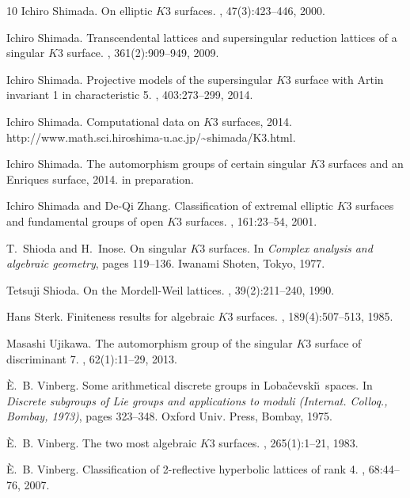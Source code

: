 \documentclass{amsart}
\theoremstyle{plain}
\theoremstyle{definition}
\theoremstyle{remark}
\numberwithin{equation}{section}
\numberwithin{table}{section}
\numberwithin{figure}{section}
\begin{document}
\begin{thebibliography}{10}
Ichiro Shimada.
\newblock On elliptic {$K3$} surfaces.
, 47(3):423--446, 2000.


Ichiro Shimada.
\newblock Transcendental lattices and supersingular reduction lattices of a
  singular {$K3$} surface.
, 361(2):909--949, 2009.


Ichiro Shimada.
\newblock Projective models of the supersingular {$K$}3 surface with {A}rtin
  invariant 1 in characteristic 5.
, 403:273--299, 2014.

Ichiro Shimada.
\newblock Computational data on $K3$ surfaces, 2014. 
\newblock 
  http://www.math.sci.hiroshima-u.ac.jp/{\textasciitilde}shimada/K3.html.
  

Ichiro Shimada.
\newblock The automorphism groups of certain singular $K3$ surfaces and an Enriques surface, 2014.
\newblock in preparation.


Ichiro Shimada and De-Qi Zhang.
\newblock Classification of extremal elliptic {$K3$} surfaces and fundamental
  groups of open {$K3$} surfaces.
, 161:23--54, 2001.

T.~Shioda and H.~Inose.
\newblock On singular {$K3$} surfaces.
\newblock In {\em Complex analysis and algebraic geometry}, pages 119--136.
  Iwanami Shoten, Tokyo, 1977.

Tetsuji Shioda.
\newblock On the {M}ordell-{W}eil lattices.
, 39(2):211--240, 1990.


Hans Sterk.
\newblock Finiteness results for algebraic {$K3$} surfaces.
, 189(4):507--513, 1985.

Masashi Ujikawa.
\newblock The automorphism group of the singular {$K3$} surface of discriminant
  7.
, 62(1):11--29, 2013.

{\`E}.~B. Vinberg.
\newblock Some arithmetical discrete groups in {L}oba\v cevski\u\i\ spaces.
\newblock In {\em Discrete subgroups of {L}ie groups and applications to moduli
  ({I}nternat. {C}olloq., {B}ombay, 1973)}, pages 323--348. Oxford Univ. Press,
  Bombay, 1975.


{\`E}.~B. Vinberg.
\newblock The two most algebraic {$K3$} surfaces.
, 265(1):1--21, 1983.

{\`E}.~B. Vinberg.
\newblock Classification of 2-reflective hyperbolic lattices of rank 4.
, 68:44--76, 2007.

\end{thebibliography}
\end{document}

